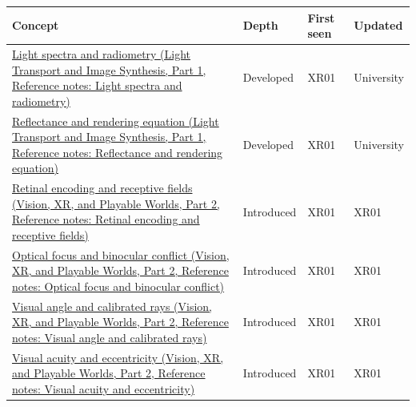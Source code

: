 {\def\LTcaptype{none} %
\begin{longtable}[]{@{}
  >{\raggedright\arraybackslash}p{}
  >{\raggedright\arraybackslash}p{}
  >{\raggedright\arraybackslash}p{}
  >{\raggedright\arraybackslash}p{}@{}}
\toprule\noalign{}
\begin{minipage}[b]{\linewidth}\raggedright
Concept
\end{minipage} & \begin{minipage}[b]{\linewidth}\raggedright
Depth
\end{minipage} & \begin{minipage}[b]{\linewidth}\raggedright
First seen
\end{minipage} & \begin{minipage}[b]{\linewidth}\raggedright
Updated
\end{minipage} \\
\midrule\noalign{}
\endhead
\bottomrule\noalign{}
\endlastfoot
\href{../04-Light-Transport-and-Image-Synthesis-P01/main.pdf\#appendix-215c2570199b}{Light spectra and radiometry (Light Transport and Image Synthesis, Part 1, Reference notes: Light spectra and radiometry)} & Developed & XR01 & University \\
\href{../04-Light-Transport-and-Image-Synthesis-P01/main.pdf\#appendix-96da0b153b77}{Reflectance and rendering equation (Light Transport and Image Synthesis, Part 1, Reference notes: Reflectance and rendering equation)} & Developed & XR01 & University \\
\href{../07-Vision-XR-and-Playable-Worlds-P02/main.pdf\#appendix-7281c15ac44a}{Retinal encoding and receptive fields (Vision, XR, and Playable Worlds, Part 2, Reference notes: Retinal encoding and receptive fields)} & Introduced & XR01 & XR01 \\
\href{../07-Vision-XR-and-Playable-Worlds-P02/main.pdf\#appendix-f90cee1be7a4}{Optical focus and binocular conflict (Vision, XR, and Playable Worlds, Part 2, Reference notes: Optical focus and binocular conflict)} & Introduced & XR01 & XR01 \\
\href{../07-Vision-XR-and-Playable-Worlds-P02/main.pdf\#appendix-7d356c396d1a}{Visual angle and calibrated rays (Vision, XR, and Playable Worlds, Part 2, Reference notes: Visual angle and calibrated rays)} & Introduced & XR01 & XR01 \\
\href{../07-Vision-XR-and-Playable-Worlds-P02/main.pdf\#appendix-b491fc48c54b}{Visual acuity and eccentricity (Vision, XR, and Playable Worlds, Part 2, Reference notes: Visual acuity and eccentricity)} & Introduced & XR01 & XR01 \\

\end{longtable}}
